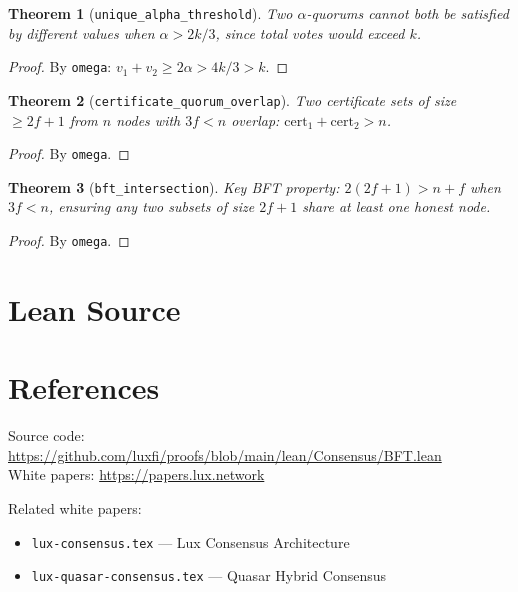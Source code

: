 \documentclass[11pt]{article}
\newtheorem{theorem}{Theorem}
\begin{document}
\begin{theorem}[\texttt{unique\_alpha\_threshold}]
Two $\alpha$-quorums cannot both be satisfied by different values when $\alpha > 2k/3$, since total votes would exceed $k$.
\end{theorem}
\begin{proof}
By \texttt{omega}: $v_1 + v_2 \geq 2\alpha > 4k/3 > k$.
\end{proof}

\begin{theorem}[\texttt{certificate\_quorum\_overlap}]
Two certificate sets of size $\geq 2f+1$ from $n$ nodes with $3f < n$ overlap: $\text{cert}_1 + \text{cert}_2 > n$.
\end{theorem}
\begin{proof}
By \texttt{omega}.
\end{proof}

\begin{theorem}[\texttt{bft\_intersection}]
Key BFT property: $2(2f+1) > n + f$ when $3f < n$, ensuring any two subsets of size $2f+1$ share at least one honest node.
\end{theorem}
\begin{proof}
By \texttt{omega}.
\end{proof}


\section{Lean Source}


\section{References}
\noindent Source code: \url{https://github.com/luxfi/proofs/blob/main/lean/Consensus/BFT.lean}\\
\noindent White papers: \url{https://papers.lux.network}

\noindent Related white papers:
\begin{itemize}
  \item \texttt{lux-consensus.tex} --- Lux Consensus Architecture
  \item \texttt{lux-quasar-consensus.tex} --- Quasar Hybrid Consensus
\end{itemize}
\end{document}
